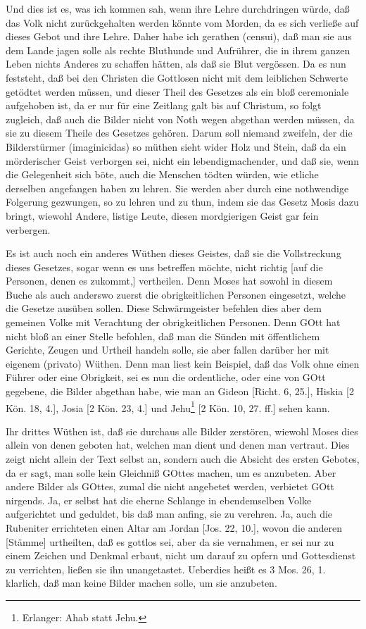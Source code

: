 Und dies ist es, was ich kommen sah, wenn ihre Lehre durchdringen würde, daß das Volk nicht zurückgehalten werden könnte vom Morden, da es sich verließe auf dieses Gebot und ihre Lehre. Daher habe ich gerathen (censui), daß man sie aus dem Lande jagen solle als rechte Bluthunde und Aufrührer, die in ihrem ganzen Leben nichts Anderes zu schaffen hätten, als daß sie Blut vergössen. Da es nun feststeht, daß bei den Christen die Gottlosen nicht mit dem leiblichen Schwerte getödtet werden müssen, und dieser Theil des Gesetzes als ein bloß ceremoniale aufgehoben ist, da er nur für eine Zeitlang galt bis auf Christum, so folgt zugleich, daß auch die Bilder nicht von Noth wegen abgethan werden müssen, da sie zu diesem Theile des Gesetzes gehören. Darum soll niemand zweifeln, der die Bilderstürmer (imaginicidas) so müthen sieht wider Holz und Stein, daß da ein mörderischer Geist verborgen sei, nicht ein lebendigmachender, und daß sie, wenn die Gelegenheit
sich böte, auch die Menschen tödten würden, wie etliche derselben angefangen haben zu lehren. Sie werden aber durch eine nothwendige Folgerung gezwungen, so zu lehren und zu thun, indem sie das Gesetz Mosis dazu bringt, wiewohl Andere, listige Leute, diesen mordgierigen Geist gar fein verbergen.

Es ist auch noch ein anderes Wüthen dieses Geistes, daß sie die Vollstreckung dieses Gesetzes, sogar wenn es uns betreffen möchte, nicht richtig [auf die Personen, denen es zukommt,] vertheilen. Denn Moses hat sowohl in diesem Buche als auch anderswo zuerst die obrigkeitlichen Personen eingesetzt, welche die Gesetze ausüben sollen. Diese Schwärmgeister befehlen dies aber dem gemeinen Volke mit Verachtung der obrigkeitlichen Personen. Denn GOtt hat nicht bloß an einer Stelle befohlen, daß man die Sünden mit öffentlichem Gerichte, Zeugen und Urtheil handeln solle, sie aber fallen darüber her mit eigenem (privato) Wüthen. Denn man liest kein Beispiel, daß das Volk ohne einen Führer oder eine Obrigkeit, sei es nun die ordentliche, oder eine von GOtt gegebene, die Bilder abgethan habe, wie man an Gideon [Richt. 6, 25.], Hiskia [2 Kön. 18, 4.], Josia [2 Kön. 23, 4.] und Jehu\footnote{Erlanger: Ahab statt Jehu.} [2 Kön. 10, 27. ff.] sehen kann.

Ihr drittes Wüthen ist, daß sie durchaus alle Bilder zerstören, wiewohl Moses dies allein von denen geboten hat, welchen man dient und denen man vertraut. Dies zeigt nicht allein der Text selbst an, sondern auch die Absicht des ersten Gebotes, da er sagt, man solle kein Gleichniß GOttes machen, um es anzubeten. Aber andere Bilder als GOttes, zumal die nicht angebetet werden, verbietet GOtt nirgends. Ja, er selbst hat die eherne Schlange in ebendemselben Volke aufgerichtet und geduldet, bis daß man anfing, sie zu verehren. Ja, auch die Rubeniter errichteten einen Altar am Jordan [Jos. 22, 10.], wovon die anderen [Stämme] urtheilten, daß es gottlos sei, aber da sie vernahmen, er sei nur zu einem Zeichen und Denkmal erbaut, nicht um darauf zu opfern und Gottesdienst zu verrichten, ließen sie ihn unangetastet. Ueberdies heißt es 3 Mos. 26, 1. klarlich, daß man keine Bilder machen solle, um sie anzubeten.

